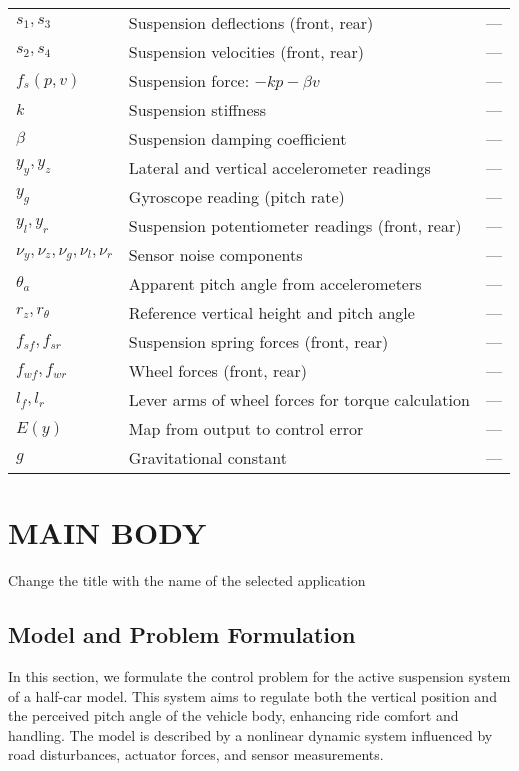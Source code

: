 \documentclass[]{report}
\begin{document}
\begin{table}[H]
\begin{tabular}{lll}
		$s_1, s_3$ & Suspension deflections (front, rear) & --- \\
		$s_2, s_4$ & Suspension velocities (front, rear) & --- \\
		$f_s(p, v)$ & Suspension force: $-kp - \beta v$ & --- \\
		$k$ & Suspension stiffness & --- \\
		$\beta$ & Suspension damping coefficient & --- \\
		$y_y, y_z$ & Lateral and vertical accelerometer readings & --- \\
		$y_g$ & Gyroscope reading (pitch rate) & --- \\
		$y_l, y_r$ & Suspension potentiometer readings (front, rear) & --- \\
		$\nu_y, \nu_z, \nu_g, \nu_l, \nu_r$ & Sensor noise components & --- \\
		$\theta_a$ & Apparent pitch angle from accelerometers & --- \\
		$r_z, r_\theta$ & Reference vertical height and pitch angle & --- \\
		$f_{sf}, f_{sr}$ & Suspension spring forces (front, rear) & --- \\
		$f_{wf}, f_{wr}$ & Wheel forces (front, rear) & --- \\
		$l_f, l_r$ & Lever arms of wheel forces for torque calculation & --- \\
		$E(y)$ & Map from output to control error & --- \\
		$g$ & Gravitational constant & --- \\
		\bottomrule
	\end{tabular}
\end{table}
	
	\chapter{MAIN BODY}
	Change the title with the name of the selected application
	
	\section{Model and Problem Formulation}
	In this section, we formulate the control problem for the active suspension system of a half-car model. This system aims to regulate both the vertical position and the perceived pitch angle of the vehicle body, enhancing ride comfort and handling. The model is described by a nonlinear dynamic system influenced by road disturbances, actuator forces, and sensor measurements.
	
\end{document}
